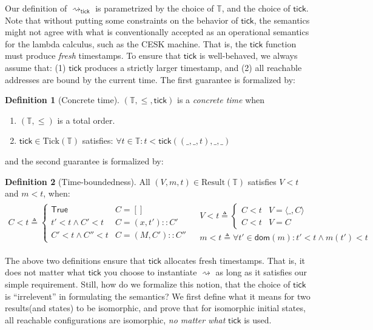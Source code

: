 \documentclass[acmsmall,review]{acmart}\settopmatter{printfolios=true,printccs=false,printacmref=false}
\theoremstyle{definition}
\newtheorem{definition}{Definition}[section]
\newcommand*{\cons}{::}
\newcommand*{\Time}{\mathbb{T}}
\newcommand*{\mem}{m}
\newcommand*{\Result}{\text{Result}}
\newcommand*{\Tick}{\text{Tick}}
\newcommand*{\semarrow}{\rightsquigarrow}
\newcommand*{\tick}{\mathsf{tick}}
\begin{document}
Our definition of $\semarrow_\tick$ is parametrized by the choice of $\Time$, and the choice of $\tick$.
Note that without putting some constraints on the behavior of $\tick$, the semantics might not agree with what is conventionally accepted as an operational semantics for the lambda calculus, such as the CESK machine.
That is, the $\tick$ function must produce \emph{fresh} timestamps.
To ensure that $\tick$ is well-behaved, we always assume that: (1) $\tick$ produces a strictly larger timestamp, and (2) all reachable addresses are bound by the current time.
The first guarantee is formalized by:
\begin{definition}[Concrete time]
  $(\Time, \le, \tick)$ is a \emph{concrete time} when
  \begin{enumerate}
    \item $(\Time, \le)$ is a total order.
    \item $\tick\in\Tick(\Time)$ satisfies: $\forall t\in\Time:t <\tick((\_,\_,t),\_,\_)$
  \end{enumerate}
\end{definition}
and the second guarantee is formalized by:
\begin{definition}[Time-boundedness]
  All $(V,\mem,t)\in\Result(\Time)$ satisfies $V < t$ and $\mem < t$, when:
  \[
    \begin{array}{cc}
      C < t\triangleq
      \begin{cases}
        \mathsf{True}        & C=[]              \\
        t' < t\wedge C' < t  & C=(x,t')\cons C'  \\
        C' < t\wedge C'' < t & C=(M,C')\cons C''
      \end{cases}
       &
      \begin{array}{l}
        V < t\triangleq
        \begin{cases}
          C < t & V=\langle\_,C\rangle \\
          C < t & V=C
        \end{cases} \\
        \mem < t\triangleq\forall t'\in\mathsf{dom}(\mem):t'<t\wedge\mem(t') < t
      \end{array}
    \end{array}
  \]
\end{definition}

The above two definitions ensure that $\tick$ allocates fresh timestamps.
That is, it does not matter what $\tick$ you choose to instantiate $\semarrow$ as long as it satisfies our simple requirement.
Still, how do we formalize this notion, that the choice of $\tick$ is ``irrelevent'' in formulating the semantics?
We first define what it means for two results(and states) to be isomorphic, and prove that for isomorphic initial states, all reachable configurations are isomorphic, \emph{no matter what} $\tick$ is used.
\end{document}
